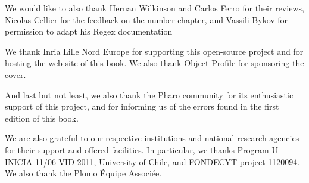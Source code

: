 \documentclass[a4paper,10pt,twoside]{book}
\begin{document}
We would like to also thank Hernan Wilkinson and Carlos Ferro for their reviews, Nicolas Cellier for the feedback on the number chapter, and Vassili Bykov for permission to adapt his Regex documentation

We thank Inria Lille Nord Europe for supporting this open-source project and for hosting the web site of this book. We also thank Object Profile for sponsoring the cover.

And last but not least, we also thank the Pharo community for its enthusiastic support of this project, and for informing us of the errors found in the first edition of this book.

We are also grateful to our respective institutions and national research agencies for their support and offered facilities. In particular, we thanks Program U-INICIA 11/06 VID 2011, University of Chile, and FONDECYT project 1120094. We also thank the Plomo \'Equipe Associ\'ee.

\ifx\wholebook\relax\else
   
   
\end{document}
